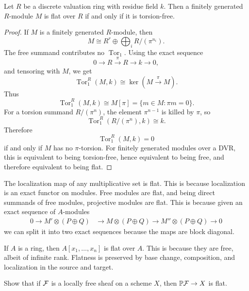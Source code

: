 \documentclass[12pt]{article}
\begin{document}
\begin{corollary}
    Let $R$ be a discrete valuation ring with residue field $k$. Then a finitely generated $R$-module $M$ is flat over $R$ if and only if it is torsion-free.
\end{corollary}

\begin{proof}
    If $M$ is a finitely generated $R$-module, then
    \[
        M\cong R^r\oplus \bigoplus_i R/(\pi^{n_i}).
    \]
    The free summand contributes no $\operatorname{Tor}_1$. Using the exact sequence
    \[
        0\to R\xrightarrow{\pi} R\to k\to 0,
    \]
    and tensoring with $M$, we get
    \[
        \operatorname{Tor}_1^R(M,k)\cong \ker(M\xrightarrow{\pi} M).
    \]
    Thus
    \[
        \operatorname{Tor}_1^R(M,k)\cong M[\pi]
        =\{m\in M:\pi m=0\}.
    \]
    For a torsion summand $R/(\pi^n)$, the element $\pi^{n-1}$ is killed by $\pi$, so
    \[
        \operatorname{Tor}_1^R(R/(\pi^n),k)\cong k.
    \]
    Therefore
    \[
        \operatorname{Tor}_1^R(M,k)=0
    \]
    if and only if $M$ has no $\pi$-torsion. For finitely generated modules over a DVR, this is equivalent to being torsion-free, hence equivalent to being free, and therefore equivalent to being flat.
\end{proof}

\begin{example}
    The localization map of any multiplicative set is flat. This is because localization is an exact functor on modules.
    Free modules are flat, and being direct summands of free modules, projective modules are flat. This is because given an exact sequence of $A$-modules \begin{align*}
        0 \to M' \otimes (P\oplus Q) & \to M \otimes (P\oplus Q) \to M'' \otimes (P\oplus Q) \to 0
    \end{align*} we can split it into two exact sequences because the maps are block diagonal.
\end{example}

\begin{example}
    If $A$ is a ring, then $A[x_1,\dots,x_n]$ is flat over $A$. This is because they are free, albeit of infinite rank. Flatness is preserved by base change, composition, and localization in the source and target.
\end{example}

\begin{exercise}
    Show that if ${\mathcal{F}}$ is a locally free sheaf on a scheme $X$, then $\mathbb{P}{\mathcal{F}} \to X$ is flat.
\end{exercise}
\end{document}
